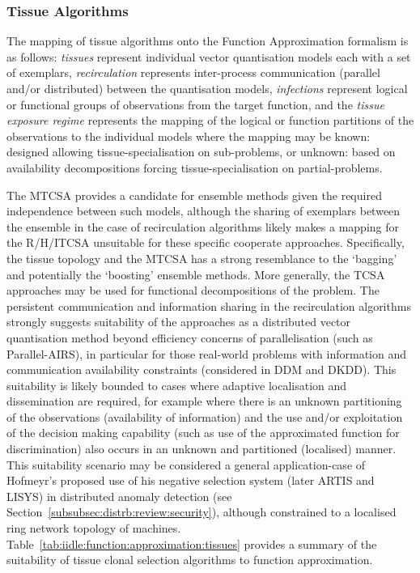 %
%
\subsubsection{Tissue Algorithms}
\label{subsec:iidle:function:approximation:applicability:tissues}
The mapping of tissue algorithms onto the Function Approximation formalism is as follows: \emph{tissues} represent individual vector quantisation models each with a set of exemplars, \emph{recirculation} represents inter-process communication (parallel and/or distributed) between the quantisation models, \emph{infections} represent logical or functional groups of observations from the target function, and the \emph{tissue exposure regime} represents the mapping of the logical or function partitions of the observations to the individual models where the mapping may be known: designed allowing tissue-specialisation on sub-problems, or unknown: based on availability decompositions forcing tissue-specialisation on partial-problems.

The MTCSA provides a candidate for ensemble methods given the required independence between such models, although the sharing of exemplars between the ensemble in the case of recirculation algorithms likely makes a mapping for the R/H/ITCSA unsuitable for these specific cooperate approaches. Specifically, the tissue topology and the MTCSA has a strong resemblance to the `bagging' and potentially the `boosting' ensemble methods. More generally, the TCSA approaches may be used for functional decompositions of the problem. 
The persistent communication and information sharing in the recirculation algorithms strongly suggests suitability of the approaches as a distributed vector quantisation method beyond efficiency concerns of parallelisation (such as Parallel-AIRS), in particular for those real-world problems with information and communication availability constraints (considered in DDM and DKDD). This suitability is likely bounded to cases where adaptive localisation and dissemination are required, for example where there is an unknown partitioning of the observations (availability of information) and the use and/or exploitation of the decision making capability (such as use of the approximated function for discrimination) also occurs in an unknown and partitioned (localised) manner. This suitability scenario may be considered a general application-case of Hofmeyr's proposed use of his negative selection system (later ARTIS and LISYS) in distributed anomaly detection (see Section~\ref{subsubsec:distrb:review:security}), although constrained to a localised ring network topology of machines.
Table~\ref{tab:iidle:function:approximation:tissues} provides a summary of the suitability of tissue clonal selection algorithms to function approximation.

